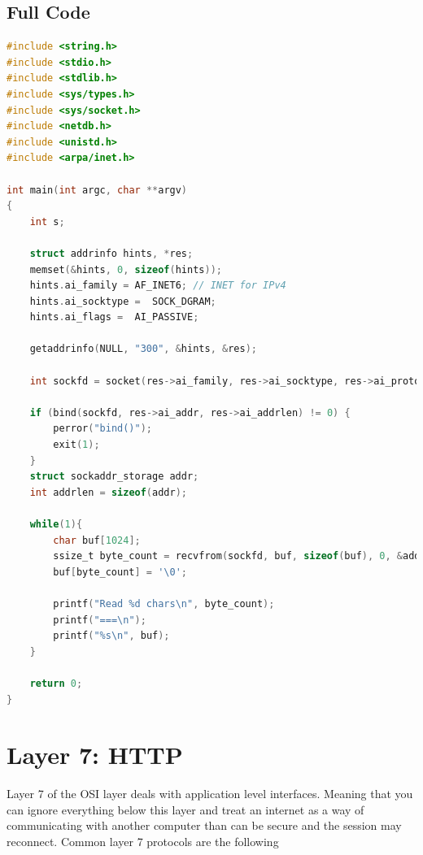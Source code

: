 \subsection{Full Code}\label{full-code}

\begin{lstlisting}[language=C]
#include <string.h>
#include <stdio.h>
#include <stdlib.h>
#include <sys/types.h>
#include <sys/socket.h>
#include <netdb.h>
#include <unistd.h>
#include <arpa/inet.h>

int main(int argc, char **argv)
{
    int s;

    struct addrinfo hints, *res;
    memset(&hints, 0, sizeof(hints));
    hints.ai_family = AF_INET6; // INET for IPv4
    hints.ai_socktype =  SOCK_DGRAM;
    hints.ai_flags =  AI_PASSIVE;

    getaddrinfo(NULL, "300", &hints, &res);

    int sockfd = socket(res->ai_family, res->ai_socktype, res->ai_protocol);

    if (bind(sockfd, res->ai_addr, res->ai_addrlen) != 0) {
        perror("bind()");
        exit(1);
    }
    struct sockaddr_storage addr;
    int addrlen = sizeof(addr);

    while(1){
        char buf[1024];
        ssize_t byte_count = recvfrom(sockfd, buf, sizeof(buf), 0, &addr, &addrlen);
        buf[byte_count] = '\0';

        printf("Read %d chars\n", byte_count);
        printf("===\n");
        printf("%s\n", buf);
    }

    return 0;
}
\end{lstlisting}


\section{Layer 7: HTTP}

Layer 7 of the OSI layer deals with application level interfaces. Meaning that you can ignore everything below this layer and treat an internet as a way of communicating with another computer than can be secure and the session may reconnect. Common layer 7 protocols are the following

